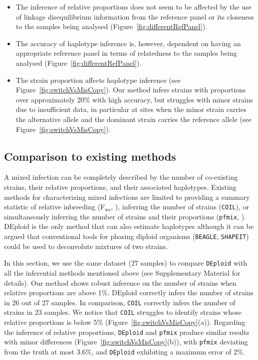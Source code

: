 \documentclass{bioinfo}
\begin{document}
\begin{itemize}

\item The inference of relative proportions does not seem to be affected by the use of linkage disequilibrium information from the reference panel or its closeness to the samples being analysed (Figure~\ref{fig:differentRefPanel}).

\item The accuracy of haplotype inference is, however, dependent on having an appropriate reference panel in terms of relatedness to the samples being analysed (Figure~\ref{fig:differentRefPanel}).

\item The strain proportion affects haplotype inference (see Figure~\ref{fig:switchVsMisCopy}). Our method infers strains with proportions over approximately 20\% with high accuracy, but struggles with minor strains due to insufficient data, in particular at sites when the minor strain carries the alternative allele and the dominant strain carries the reference allele (see Figure~\ref{fig:switchVsMisCopy}).

\end{itemize}


\subsection{Comparison to existing methods}
A mixed infection can be completely described by the number of co-existing strains, their relative proportions, and their associated haplotypes. Existing methods for characterizing mixed infections are limited to providing a summary statistic of relative inbreeding (F$_{\textrm{ws}}$, \cite{Manske2012}), inferring the number of strains (\texttt{COIL}), or simultaneously inferring the number of strains and their proportions (\texttt{pfmix}, \cite{Jack2016} ). DEploid is the only method that can also estimate haplotypes although it can be argued that conventional tools for phasing diploid organisms (\texttt{BEAGLE}, \texttt{SHAPEIT}) could be used to deconvolute mixtures of two strains.

In this section, we use the same dataset (27 samples) to compare \texttt{DEploid} with all the inferential methods mentioned above (see Supplementary Material for details). Our method shows robust inference on the number of strains when relative proportions are above 1\%. DEploid correctly infers the number of strains in 26 out of 27 samples. In comparison, \texttt{COIL} correctly infers the number of strains in 23 samples. We notice that \texttt{COIL} struggles to identify strains whose relative proportions is below 5\% (Figure~\ref{fig:switchVsMisCopy}(a)). Regarding the inference of relative proportions, \texttt{DEploid} and \texttt{pfmix} produce similar results with minor differences (Figure~\ref{fig:switchVsMisCopy}(b)), with \texttt{pfmix} deviating from the truth at most 3.6\%, and \texttt{DEploid} exhibiting a maximum error of 2\%.
\end{document}

